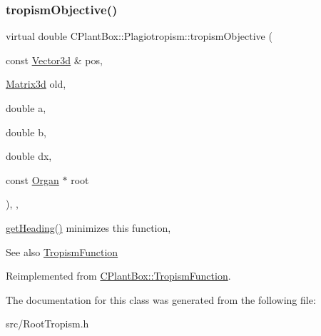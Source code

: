 \subsubsection{\texorpdfstring{tropism\+Objective()}{tropismObjective()}}
{\footnotesize\ttfamily virtual double C\+Plant\+Box\+::\+Plagiotropism\+::tropism\+Objective (\begin{DoxyParamCaption}\item[{const \hyperlink{classCPlantBox_1_1Vector3d}{Vector3d} \&}]{pos,  }\item[{\hyperlink{classCPlantBox_1_1Matrix3d}{Matrix3d}}]{old,  }\item[{double}]{a,  }\item[{double}]{b,  }\item[{double}]{dx,  }\item[{const \hyperlink{classCPlantBox_1_1Organ}{Organ} $\ast$}]{root }\end{DoxyParamCaption})\hspace{0.3cm}{\ttfamily [inline]}, {\ttfamily [override]}, {\ttfamily [virtual]}}



\hyperlink{classCPlantBox_1_1TropismFunction_adb52b88734a94fe1365a00e02c7e6be5}{get\+Heading()} minimizes this function, 

\begin{DoxySeeAlso}{See also}
\hyperlink{classCPlantBox_1_1TropismFunction}{Tropism\+Function} 
\end{DoxySeeAlso}


Reimplemented from \hyperlink{classCPlantBox_1_1TropismFunction_a4f2c79fff55d1398c98a070dd8ebbe08}{C\+Plant\+Box\+::\+Tropism\+Function}.



The documentation for this class was generated from the following file\+:\begin{DoxyCompactItemize}
\item 
src/Root\+Tropism.\+h\end{DoxyCompactItemize}
